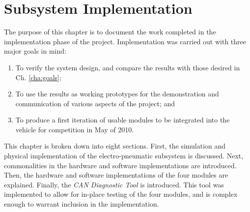 \chapter{Subsystem Implementation\label{cha:implementation}}

The purpose of this chapter is to document the work completed in the implementation phase of the project. Implementation was carried out with three major goals in mind:

\begin{enumerate}
  \item To verify the system design, and compare the results with those desired in Ch. \ref{cha:goals};
  \item To use the results as working prototypes for the demonstration and communication of various aspects of the project; and
  \item To produce a first iteration of usable modules to be integrated into the vehicle for competition in May of 2010.
\end{enumerate}

This chapter is broken down into eight sections. First, the simulation and physical implementation of the electro-pneumatic subsystem is discussed. Next, commonalities in the hardware and software implementations are introduced. Then, the hardware and software implementations of the four modules are explained. Finally, the \emph{CAN Diagnostic Tool} is introduced. This tool was implemented to allow for in-place testing of the four modules, and is complex enough to warrant inclusion in the implementation.








